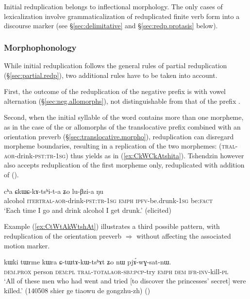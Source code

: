 Initial reduplication belongs to inflectional morphology. The only cases of lexicalization involve grammaticalization of reduplicated finite verb form into a discourse marker  (see §\ref{sec:delimitative} and §\ref{sec:redp.protasis} below).
 
 \subsubsection{Morphophonology} \label{sec:initial.redp.morpho}
While initial reduplication follows the general rules of partial reduplication (§\ref{sec:partial.redp}), two additional rules have to be taken into account. 

First, the outcome of the reduplication of the negative prefix  is  with vowel alternation (§\ref{sec:neg.allomorphs}), not distinguishable from that of the prefix .

Second, when the initial syllable of the word contains more than one morpheme, as in the case of the  or  allomorphs of the translocative prefix combined with an orientation preverb (§\ref{sec:translocative.morpho}), reduplication can disregard morpheme boundaries, resulting in a replication of the  two morphemes:  (\textsc{tral}-\textsc{aor}-drink-\textsc{pst}:\textsc{tr}-\textsc{1sg}) thus yields  as in  (\ref{ex:CkWCkAtshita}). Tshendzin however also accepts reduplication of the first morpheme only, reduplicated with addition of   ().
 
\begin{exe}
\ex \label{ex:CkWCkAtshita}
\gll cʰa ɕkɯ\redp{}ɕ-kɤ-tsʰi-t-a ʑo lu-βzi-a ŋu \\
alcohol \textsc{iter}\redp{}\textsc{tral}-\textsc{aor}-drink-\textsc{pst}:\textsc{tr}-\textsc{1sg} \textsc{emph} \textsc{ipfv}-be.drunk-\textsc{1sg} be:\textsc{fact} \\
\glt `Each time I go and drink alcohol I get drunk.' (elicited)
\end{exe}

Example (\ref{ex:CtWtAkWtshAt}) illustrates a third possible pattern, with reduplication of the orientation preverb  $\Rightarrow$  without affecting the associated motion marker.

\begin{exe}
\ex \label{ex:CtWtAkWtshAt}
\gll kɯki tɯrme kɯra ɕ-tɯ\redp{}tɤ-kɯ-tsʰɤt ʑo nɯ pjɤ́-wɣ-sat-nɯ. \\
\textsc{dem}.\textsc{prox} person \textsc{dem}:\textsc{pl} \textsc{tral}-\textsc{total}\redp{}\textsc{aor}-\textsc{sbj}:\textsc{pcp}-try \textsc{emph} \textsc{dem} \textsc{ifr}-\textsc{inv}-kill-\textsc{pl} \\
\glt `All of these men who had went and tried [to discover the princesses' secret] were killed.' (140508 shier ge tiaowu de gongzhu-zh) ()
\end{exe}

